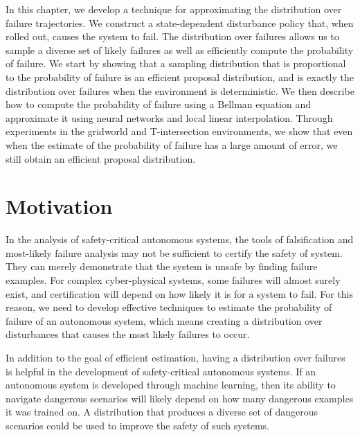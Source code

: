 In this chapter, we develop a technique for approximating the distribution over failure trajectories. We construct a state-dependent disturbance policy that, when rolled out, causes the system to fail. The distribution over failures allows us to sample a diverse set of likely failures as well as efficiently compute the probability of failure. We start by showing that a sampling distribution that is proportional to the probability of failure is an efficient proposal distribution, and is exactly the distribution over failures when the environment is deterministic. We then describe how to compute the probability of failure using a Bellman equation and approximate it using neural networks and local linear interpolation. Through experiments in the gridworld and T-intersection environments, we show that even when the estimate of the probability of failure has a large amount of error, we still obtain an efficient proposal distribution.

\section{Motivation}

In the analysis of safety-critical autonomous systems, the tools of falsification and most-likely failure analysis may not be sufficient to certify the safety of system. They can merely demonstrate that the system is unsafe by finding failure examples. For complex cyber-physical systems, some failures will almost surely exist, and certification will depend on how likely it is for a system to fail. For this reason, we need to develop effective techniques to estimate the probability of failure of an autonomous system, which means creating a distribution over disturbances that causes the most likely failures to occur. 

In addition to the goal of efficient estimation, having a distribution over failures is helpful in the development of safety-critical autonomous systems. If an autonomous system is developed through machine learning, then its ability to navigate dangerous scenarios will likely depend on how many dangerous examples it was trained on. A distribution that produces a diverse set of dangerous scenarios could be used to improve the safety of such systems. 

